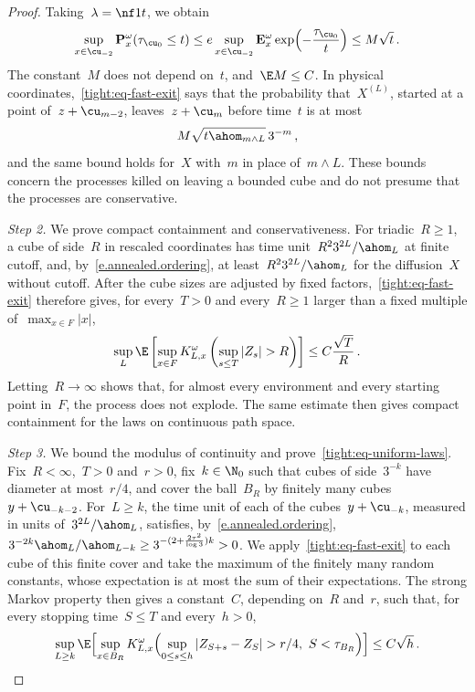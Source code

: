 \documentclass[11pt]{amsart}
\begin{document}
\begin{proof}
Taking~$\lambda=\nf1t$, we obtain
\begin{equation}
	\sup_{x\in\cu_{-2}}\mathbf P_x^\omega(\tau_{\cu_0}\leq t)
	\leq e\sup_{x\in\cu_{-2}}\mathbf E_x^\omega
	\exp\Bigl(-\frac{\tau_{\cu_0}}{t}\Bigr)
	\leq M\sqrt t\,.
	\label{tight:eq-fast-exit}
\end{equation}
The constant~$M$ does not depend on~$t$, and~$\E M\leq C$. In physical coordinates,~\eqref{tight:eq-fast-exit} says that the probability that~$X^{(L)}$, started at a point of~$z+\cu_{m-2}$, leaves~$z+\cu_m$ before time~$t$ is at most
\begin{equation}
	M\sqrt{t\ahom_{m\wedge L}}\,3^{-m}\,,
	\label{tight:eq-physical-exit}
\end{equation}
and the same bound holds for~$X$ with~$m$ in place of~$m\wedge L$. These bounds concern the processes killed on leaving a bounded cube and do not presume that the processes are conservative.

\smallskip

\emph{Step 2.} We prove compact containment and conservativeness. For triadic~$R\geq1$, a cube of side~$R$ in rescaled coordinates has time unit~$R^23^{2L}/\ahom_L$ at finite cutoff, and, by~\eqref{e.annealed.ordering}, at least~$R^23^{2L}/\ahom_L$ for the diffusion~$X$ without cutoff. After the cube sizes are adjusted by fixed factors,~\eqref{tight:eq-fast-exit} therefore gives, for every~$T>0$ and every~$R\geq1$ larger than a fixed multiple of~$\max_{x\in F}|x|$,
\begin{equation}
	\sup_L\E\left[\sup_{x\in F}K^\omega_{L,x}\left(\sup_{s\leq T}|Z_s|>R\right)\right]
	\leq C\frac{\sqrt T}{R}\,.
	\label{tight:eq-containment}
\end{equation}
Letting~$R\to\infty$ shows that, for almost every environment and every starting point in~$F$, the process does not explode. The same estimate then gives compact containment for the laws on continuous path space.

\smallskip

\emph{Step 3.} We bound the modulus of continuity and prove~\eqref{tight:eq-uniform-laws}. Fix~$R<\infty$,~$T>0$ and~$r>0$, fix~$k\in\N_0$ such that cubes of side~$3^{-k}$ have diameter at most~$r/4$, and cover the ball~$B_R$ by finitely many cubes~$y+\cu_{-k-2}$. For~$L\geq k$, the time unit of each of the cubes~$y+\cu_{-k}$, measured in units of~$3^{2L}/\ahom_L$, satisfies, by~\eqref{e.annealed.ordering},~$3^{-2k}\ahom_L/\ahom_{L-k}\geq3^{-(2+\frac{2\tau^2}{\log3})k}>0$. We apply~\eqref{tight:eq-fast-exit} to each cube of this finite cover and take the maximum of the finitely many random constants, whose expectation is at most the sum of their expectations. The strong Markov property then gives a constant~$C$, depending on~$R$ and~$r$, such that, for every stopping time~$S\leq T$ and every~$h>0$,
\begin{equation*}
	\sup_{L\geq k}\E\Bigl[\sup_{x\in B_R}K^\omega_{L,x}\Bigl(
	\sup_{0\leq s\leq h}|Z_{S+s}-Z_S|>r/4,\ S<\tau_{B_R}\Bigr)\Bigr]
	\leq C\sqrt h\,.
\end{equation*}


\end{proof}
\end{document}
